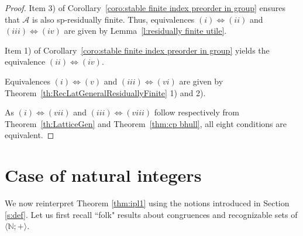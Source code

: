 \documentclass[11pt,a4paper]{article}
\theoremstyle{definition} %
\newcommand\+[1]{\mathcal{#1}} %
\newcommand{\N}{{\mathbb N}}     %
\newcommand{\Z}{{\mathbb Z}}     %
\DeclareMathOperator{\suc}{Suc}%
\begin{document}
\begin{proof}

Item 3) of Corollary~\ref{coro:stable finite index preorder in group} ensures that
$\+A$ is also sp-residually  finite.
Thus, equivalences $(i)\Leftrightarrow(ii)$ and $(iii)\Leftrightarrow(iv)$ are given by
Lemma~\ref{l:residually finite utile}.

Item 1) of Corollary~\ref{coro:stable finite index preorder in group} yields
the equivalence $(ii)\Leftrightarrow(iv)$.

Equivalences $(i)\Leftrightarrow(v)$ and $(iii)\Leftrightarrow(vi)$ are given by 
Theorem~\ref{th:RecLatGeneralResiduallyFinite} 1) and 2).

 As   $(i)\Leftrightarrow(vii)$ and $(iii)\Leftrightarrow(viii)$  follow respectively from Theorem~\ref{th:LatticeGen} 
and Theorem~\ref{thm:cp bhull}, all eight conditions are equivalent.
\end{proof}
%




\section{Case of  natural integers}%
\label{s frying pan}
We now reinterpret Theorem \ref{thm:ipl1} using the notions introduced in Section \ref{s:def}. Let us first recall ``folk" results about congruences and recognizable sets of $\langle  \N ;+\rangle$.
\end{document}
